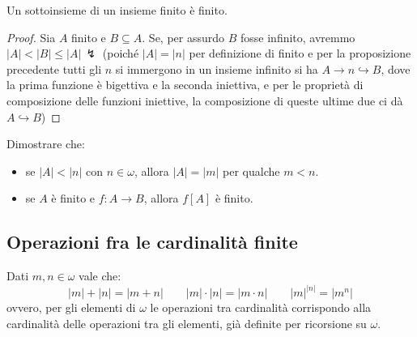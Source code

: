 \documentclass[11pt]{scrartcl}
\begin{document}
\begin{corollary}[Ovvietà]
	Un sottoinsieme di un insieme finito è finito.
\end{corollary}

\begin{proof}
	Sia $A$ finito e $B \subseteq A$. Se, per assurdo $B$ fosse infinito, avremmo $|A| < |B| \leq |A| \, \lightning$ (poiché $|A| = |n|$ per definizione di finito e per la proposizione precedente tutti gli $n$ si immergono in un insieme infinito si ha $A \rightarrow n \hookrightarrow B$, dove la prima funzione è bigettiva e la seconda iniettiva, e per le proprietà di composizione delle 
	funzioni iniettive, la composizione di queste ultime due ci dà $A \hookrightarrow B$)
\end{proof}

\begin{exercise}
	Dimostrare che:
	\begin{itemize}
		\item se $|A| < |n|$ con $n \in \omega$, allora $|A| = |m|$ per qualche $m < n$.
		\item se $A$ è finito e $f : A \rightarrow B$, allora $f[A]$ è finito.
	\end{itemize}	
\end{exercise}

\subsection{Operazioni fra le cardinalità finite}

\begin{proposition}
	\label{op_card_fin}
	Dati $m,n \in \omega$ vale che:
	\[ |m| + |n| = |m+n| \qquad |m|\cdot|n| = |m \cdot n| \qquad |m|^{|n|} = |m^n|
		\]
	ovvero, per gli elementi di $\omega$ le operazioni tra cardinalità corrispondo alla cardinalità delle operazioni tra gli elementi, già definite per ricorsione su $\omega$.
\end{proposition}
\end{document}
